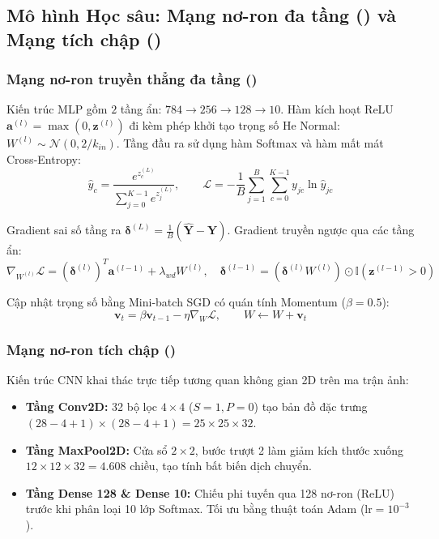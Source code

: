 \subsection{Mô hình Học sâu: Mạng nơ-ron đa tầng () và Mạng tích chập ()}
\subsubsection{Mạng nơ-ron truyền thẳng đa tầng ()}
Kiến trúc MLP gồm $2$ tầng ẩn: $784 \rightarrow 256 \rightarrow 128 \rightarrow 10$. Hàm kích hoạt ReLU $\mathbf{a}^{(l)} = \max(0, \mathbf{z}^{(l)})$ đi kèm phép khởi tạo trọng số He Normal: $W^{(l)} \sim \mathcal{N}(0, 2/k_{in})$. Tầng đầu ra sử dụng hàm Softmax và hàm mất mát Cross-Entropy:
\begin{equation}
    \hat{y}_c = \frac{e^{z_c^{(L)}}}{\sum_{j=0}^{K-1} e^{z_j^{(L)}}}, \qquad \mathcal{L} = -\frac{1}{B} \sum_{j=1}^B \sum_{c=0}^{K-1} y_{jc} \ln \hat{y}_{jc}
\end{equation}

Gradient sai số tầng ra $\boldsymbol{\delta}^{(L)} = \frac{1}{B} (\hat{\mathbf{Y}} - \mathbf{Y})$. Gradient truyền ngược qua các tầng ẩn:
\begin{equation}
    \nabla_{W^{(l)}} \mathcal{L} = (\boldsymbol{\delta}^{(l)})^T \mathbf{a}^{(l-1)} + \lambda_{wd} W^{(l)}, \quad \boldsymbol{\delta}^{(l-1)} = (\boldsymbol{\delta}^{(l)} W^{(l)}) \odot \mathbb{I}(\mathbf{z}^{(l-1)} > 0)
\end{equation}

Cập nhật trọng số bằng Mini-batch SGD có quán tính Momentum ($\beta = 0.5$):
\begin{equation}
    \mathbf{v}_t = \beta \mathbf{v}_{t-1} - \eta \nabla_W \mathcal{L}, \qquad W \leftarrow W + \mathbf{v}_t
\end{equation}

\subsubsection{Mạng nơ-ron tích chập ()}
Kiến trúc CNN khai thác trực tiếp tương quan không gian 2D trên ma trận ảnh:
\begin{itemize}
    \item \textbf{Tầng Conv2D:} 32 bộ lọc $4 \times 4$ ($S=1, P=0$) tạo bản đồ đặc trưng $(28-4+1) \times (28-4+1) = 25 \times 25 \times 32$.
    \item \textbf{Tầng MaxPool2D:} Cửa sổ $2 \times 2$, bước trượt 2 làm giảm kích thước xuống $12 \times 12 \times 32 = 4.608$ chiều, tạo tính bất biến dịch chuyển.
    \item \textbf{Tầng Dense 128 \& Dense 10:} Chiếu phi tuyến qua 128 nơ-ron (ReLU) trước khi phân loại 10 lớp Softmax. Tối ưu bằng thuật toán Adam ($\text{lr} = 10^{-3}$).
\end{itemize}

